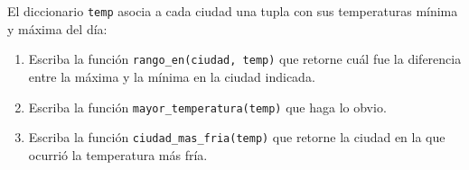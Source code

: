 El diccionario \verb!temp! asocia a cada ciudad
una tupla con sus temperaturas mínima y máxima del día:



\begin{enumerate}[leftmargin=0pt,label=\emph{\alph*})]
  \item
    Escriba la función \verb!rango_en(ciudad, temp)!
    que retorne cuál fue la dife\-rencia entre la máxima y la mínima
    en la ciudad indicada.

  \item
    Escriba la función \verb!mayor_temperatura(temp)!
    que haga lo obvio.

  \item
    Escriba la función \verb!ciudad_mas_fria(temp)!
    que retorne la ciudad en la que ocurrió la temperatura más fría.
\end{enumerate}


